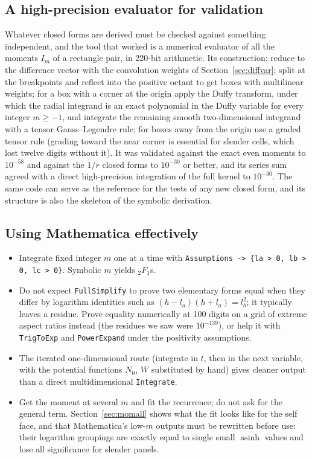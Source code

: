 \documentclass[11pt]{article}
\theoremstyle{remark}
\newcommand{\asinh}{\operatorname{asinh}}
\newcommand{\code}[1]{\texttt{#1}}
\begin{document}
\subsection{A high-precision evaluator for validation}
\label{sec:evaluator}

Whatever closed forms are derived must be checked against something independent, and
the tool that worked is a numerical evaluator of all the moments $I_m$ of a rectangle
pair, in 220-bit arithmetic. Its construction: reduce to the difference vector with
the convolution weights of Section~\ref{sec:diffvar}; split at the breakpoints and
reflect into the positive octant to get boxes with multilinear weights; for a box
with a corner at the origin apply the Duffy transform, under which the radial
integrand is an exact polynomial in the Duffy variable for every integer $m\ge -1$,
and integrate the remaining smooth two-dimensional integrand with a tensor
Gauss--Legendre rule; for boxes away from the origin use a graded tensor rule (grading
toward the near corner is essential for slender cells, which lost twelve digits
without it). It was validated against the exact even moments to $10^{-58}$ and against
the $1/r$ closed forms to $10^{-30}$ or better, and its series sum agreed with a
direct high-precision integration of the full kernel to $10^{-30}$. The same code can
serve as the reference for the tests of any new closed form, and its structure is
also the skeleton of the symbolic derivation.

\subsection{Using Mathematica effectively}

\begin{itemize}[nosep]
\item Integrate fixed integer $m$ one at a time with \code{Assumptions -> \{la > 0,
lb > 0, lc > 0\}}. Symbolic $m$ yields ${}_2F_1$s.
\item Do not expect \code{FullSimplify} to prove two elementary forms equal when they
differ by logarithm identities such as $(h-l_a)(h+l_a) = l_b^2$; it typically leaves a
residue. Prove equality numerically at 100 digits on a grid of extreme aspect ratios
instead (the residues we saw were $10^{-139}$), or help it with \code{TrigToExp} and
\code{PowerExpand} under the positivity assumptions.
\item The iterated one-dimensional route (integrate in $t$, then in the next
variable, with the potential functions $N_0$, $W$ substituted by hand) gives cleaner
output than a direct multidimensional \code{Integrate}.
\item Get the moment at several $m$ and fit the recurrence; do not ask for the
general term. Section~\ref{sec:momall} shows what the fit looks like for the self
face, and that Mathematica's low-$m$ outputs must be rewritten before use: their
logarithm groupings are exactly equal to single small $\asinh$ values and lose all
significance for slender panels.
\end{itemize}
\end{document}

